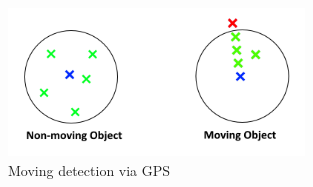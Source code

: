\begin{figure} [h]
    \includegraphics[clip, trim=0.1cm 0.1cm 0.1cm 0.1cm, width=0.7\textwidth]{src/pic/gps_data}
    \caption{Moving detection via GPS}
    \label{fig::GPSDetection}
\end{figure}

